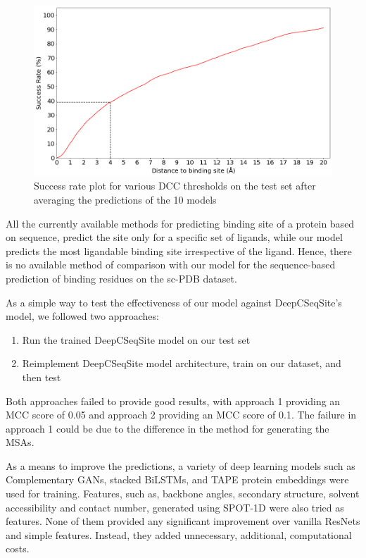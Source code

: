 \documentclass[journal=jacsat,manuscript=article]{achemso}
\begin{document}
\begin{figure}
    \centering
    \noindent\includegraphics[scale=0.45]{test_dcc.png}
    \caption{\centering Success rate plot for various DCC thresholds on the test set after averaging the predictions of the 10 models}
    \label{fig:test_dcc}
\end{figure}

All the currently available methods for predicting binding site of a protein based on sequence, predict the site only for a specific set of ligands, while our model predicts the most ligandable binding site irrespective of the ligand. Hence, there is no available method of comparison with our model for the sequence-based prediction of binding residues on the sc-PDB\cite{desaphy2015sc} dataset.

As a simple way to test the effectiveness of our model against DeepCSeqSite's model, we followed two approaches:
\begin{enumerate}
    \item Run the trained DeepCSeqSite model on our test set
    \item Reimplement DeepCSeqSite model architecture, train on our dataset, and then test
\end{enumerate}

Both approaches failed to provide good results, with approach 1 providing an MCC score of 0.05 and approach 2 providing an MCC score of 0.1. The failure in approach 1 could be due to the difference in the method for generating the MSAs.

As a means to improve the predictions, a variety of deep learning models such as Complementary GANs, stacked BiLSTMs, and TAPE protein embeddings were used for training. Features, such as, backbone angles, secondary structure, solvent accessibility and contact number, generated using SPOT-1D \cite{hanson2018accurate} were also tried as features. None of them provided any significant improvement over vanilla ResNets and simple features. Instead, they added unnecessary, additional, computational costs.
\end{document}
